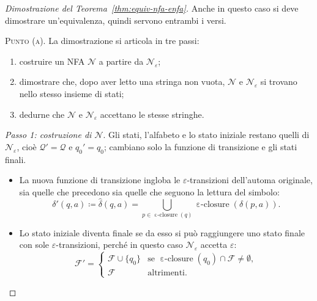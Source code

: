 \documentclass[a4paper, 11pt, oneside]{book}
\theoremstyle{formale}
\DeclareMathOperator{\eclosure}{\varepsilon\text{-}closure}
\begin{document}
    \begin{proof}[Dimostrazione del Teorema~\ref{thm:equiv-nfa-enfa}]
        Anche in questo caso si deve dimostrare un'equivalenza, quindi servono entrambi i
        versi.

        \textsc{Punto (a)}. La dimostrazione si articola in tre passi:
        \begin{enumerate}
            \item costruire un NFA $\mathcal{N}$ a partire da $\mathcal{N}_\varepsilon$;
            \item dimostrare che, dopo aver letto una stringa non vuota, $\mathcal{N}$ e
                $\mathcal{N}_\varepsilon$ si trovano nello stesso insieme di stati;
            \item dedurne che $\mathcal{N}$ e $\mathcal{N}_\varepsilon$ accettano le
                stesse stringhe.
        \end{enumerate}

        \emph{Passo 1: costruzione di $\mathcal{N}$}. Gli stati, l'alfabeto e lo stato
        iniziale restano quelli di $\mathcal{N}_\varepsilon$, cio\`e
        $\mathcal{Q}' = \mathcal{Q}$ e $q_0' = q_0$; cambiano solo la funzione di
        transizione e gli stati finali.
        \begin{itemize}
            \item La nuova funzione di transizione ingloba le $\varepsilon$-transizioni
                dell'automa originale, sia quelle che precedono sia quelle che seguono la
                lettura del simbolo:
                \begin{equation*}
                    \delta'(q, a) \coloneqq \hat{\delta}(q, a)
                    = \bigcup_{p \in \eclosure(q)} \eclosure(\delta(p, a)).
                \end{equation*}
            \item Lo stato iniziale diventa finale se da esso si pu\`o raggiungere uno
                stato finale con sole $\varepsilon$-transizioni, perch\'e in questo caso
                $\mathcal{N}_\varepsilon$ accetta $\varepsilon$:
                \begin{equation*}
                    \mathcal{F}' =
                    \begin{cases}
                        \mathcal{F} \cup \{q_0\} & \text{se } \eclosure(q_0) \cap
                            \mathcal{F} \neq \emptyset, \\
                        \mathcal{F} & \text{altrimenti.}
                    \end{cases}
                \end{equation*}
        \end{itemize}


\end{proof}
\end{document}
